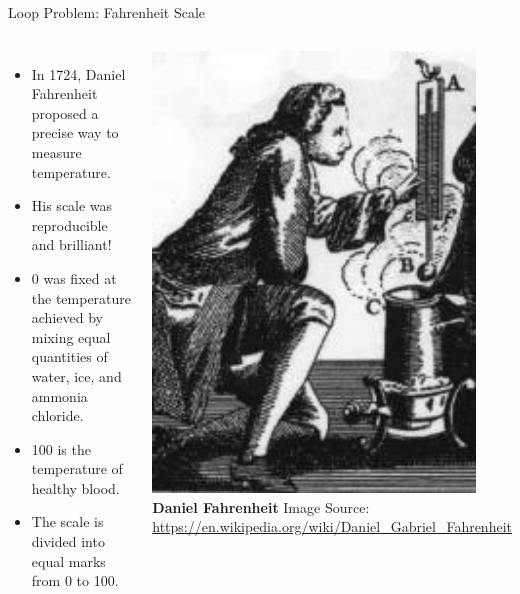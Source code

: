 \documentclass[xcolor=table]{beamer}
\begin{document}
\begin{frame}{Loop Problem: Fahrenheit Scale}
  \begin{columns}
    \begin{itemize}[<+->]
      \item In 1724, Daniel Fahrenheit proposed a precise way to measure temperature.
      \item His scale was reproducible and brilliant!
      \item 0 was fixed at the temperature achieved by mixing equal quantities of water, ice, and ammonia chloride.
      \item 100 is the temperature of healthy blood.
      \item The scale is divided into equal marks from 0 to 100.
    \end{itemize}

    \begin{center}
      \includegraphics[width=0.9\textwidth]{images/fahrenheit}
      {\tiny\newline\textbf{Daniel Fahrenheit} \newline Image Source: \url{https://en.wikipedia.org/wiki/Daniel_Gabriel_Fahrenheit}}
    \end{center}
  \end{columns}
\end{frame}
\end{document}
